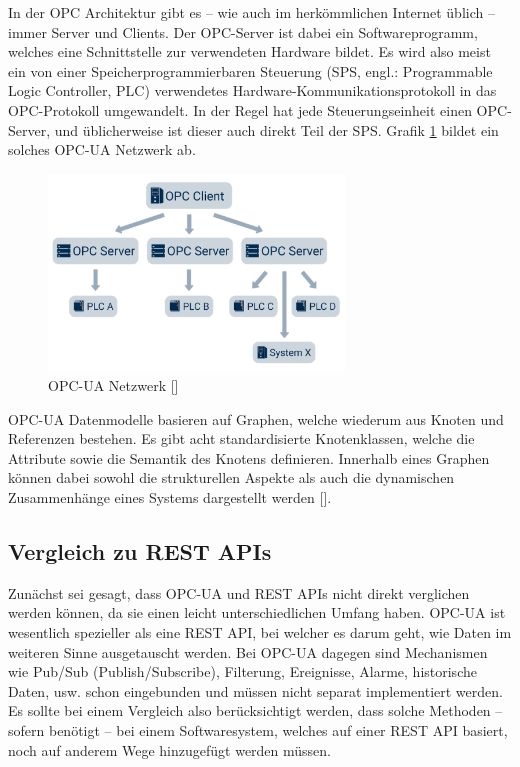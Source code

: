 In der OPC Architektur gibt es – wie auch im herkömmlichen Internet üblich – immer Server und Clients. Der OPC-Server ist dabei ein Softwareprogramm, welches eine Schnittstelle zur verwendeten Hardware bildet. Es wird also meist ein von einer Speicherprogrammierbaren Steuerung (SPS, engl.: Programmable Logic Controller, PLC) verwendetes Hardware-Kommunikationsprotokoll in das OPC-Protokoll umgewandelt. In der Regel hat jede Steuerungseinheit einen OPC-Server, und üblicherweise ist dieser auch direkt Teil der SPS. Grafik \ref{fig:OPC} bildet ein solches OPC-UA Netzwerk ab.
%
\begin{figure}[htbp]
	\centering\includegraphics[width=0.7\textwidth]{images/03/OPC_Netzwerk.png}
    \caption{OPC-UA Netzwerk [\cite{opcNetwork}]}
    \label{fig:OPC}
\end{figure}

OPC-UA Datenmodelle basieren auf Graphen, welche wiederum aus Knoten und Referenzen bestehen. Es gibt acht standardisierte Knotenklassen, welche die Attribute sowie die Semantik des Knotens definieren. Innerhalb eines Graphen können dabei sowohl die strukturellen Aspekte als auch die dynamischen Zusammenhänge eines Systems dargestellt werden [\cite{opcAnderl}].

\subsection*{Vergleich zu REST APIs}
\label{subsec:opcua_vergleichrest}

Zunächst sei gesagt, dass OPC-UA und REST APIs nicht direkt verglichen werden können, da sie einen leicht unterschiedlichen Umfang haben. OPC-UA ist wesentlich spezieller als eine REST API, bei welcher es darum geht, wie Daten im weiteren Sinne ausgetauscht werden. Bei OPC-UA dagegen sind Mechanismen wie Pub/Sub (Publish/Subscribe), Filterung, Ereignisse, Alarme, historische Daten, usw. schon eingebunden und müssen nicht separat implementiert werden. Es sollte bei einem Vergleich also berücksichtigt werden, dass solche Methoden – sofern benötigt – bei einem Softwaresystem, welches auf einer REST API basiert, noch auf anderem Wege hinzugefügt werden müssen.

